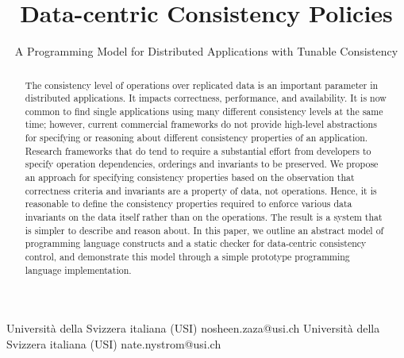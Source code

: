\documentclass[numbers]{sigplanconf}
\begin{document}
\setlength{\pdfpageheight}{\paperheight}
\setlength{\pdfpagewidth}{\paperwidth}





\title{Data-centric Consistency Policies}
\subtitle{A Programming Model for Distributed Applications with Tunable Consistency}

           {Universit\`a della Svizzera italiana (USI)}
           {nosheen.zaza@usi.ch}
           {Universit\`a della Svizzera italiana (USI)}
           {nate.nystrom@usi.ch}

\maketitle

\begin{abstract}
The consistency level of operations over replicated data is 
an important parameter in distributed applications. It impacts correctness, 
performance, and availability. It is now common to find single applications
using many different consistency
levels at the same time; however, current commercial frameworks do not
provide high-level abstractions for specifying or reasoning about different
consistency properties of an application. Research frameworks that do tend to require a
substantial effort from developers to specify operation dependencies, orderings
and invariants to be preserved.
We propose an approach for specifying consistency properties based on the
observation that
correctness criteria and invariants are a property of data, not operations.
Hence, it is reasonable to define the consistency properties
required to enforce various data invariants on the data itself rather than on the operations. 
The result is a system that is simpler to describe and reason about. 
In this paper, we outline an abstract model of programming language constructs
and a static checker for data-centric consistency control, and demonstrate
this model through a simple prototype programming language implementation.
\end{abstract}
\end{document}

